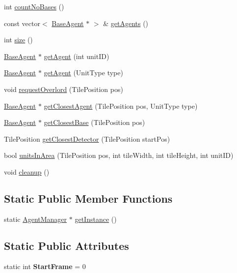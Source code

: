 \begin{DoxyCompactItemize}
\item 
int \hyperlink{class_agent_manager_a2e83c9fd3ac2e6119eded5785c8f04ce}{count\-No\-Bases} ()
\item 
const vector$<$ \hyperlink{class_base_agent}{Base\-Agent} $\ast$ $>$ \& \hyperlink{class_agent_manager_ac569494f341aa7387467de606b2f966a}{get\-Agents} ()
\item 
int \hyperlink{class_agent_manager_a8536930d26278a365165e8cdc0e12f44}{size} ()
\item 
\hyperlink{class_base_agent}{Base\-Agent} $\ast$ \hyperlink{class_agent_manager_a294399a85d15e11dfd06728f35bd6d23}{get\-Agent} (int unit\-I\-D)
\item 
\hyperlink{class_base_agent}{Base\-Agent} $\ast$ \hyperlink{class_agent_manager_aa5c4ca79ff252151f426095e914caac6}{get\-Agent} (Unit\-Type type)
\item 
void \hyperlink{class_agent_manager_a5bd9d232ef3e7d4a7d26bbade757a57d}{request\-Overlord} (Tile\-Position pos)
\item 
\hyperlink{class_base_agent}{Base\-Agent} $\ast$ \hyperlink{class_agent_manager_ac82b461b794ee807e01b26bbfa746068}{get\-Closest\-Agent} (Tile\-Position pos, Unit\-Type type)
\item 
\hyperlink{class_base_agent}{Base\-Agent} $\ast$ \hyperlink{class_agent_manager_a04a3159ec5e1b551fccb6368ab2db43d}{get\-Closest\-Base} (Tile\-Position pos)
\item 
Tile\-Position \hyperlink{class_agent_manager_a364cf19e3cd4ec5a6fa381ec77d9d451}{get\-Closest\-Detector} (Tile\-Position start\-Pos)
\item 
bool \hyperlink{class_agent_manager_aa41dbe20c6ddfba17f0422a0a879cf76}{units\-In\-Area} (Tile\-Position pos, int tile\-Width, int tile\-Height, int unit\-I\-D)
\item 
void \hyperlink{class_agent_manager_ac9cf8b4b1e2cd2aa967861ef0adbe0b6}{cleanup} ()
\end{DoxyCompactItemize}
\subsection*{Static Public Member Functions}
\begin{DoxyCompactItemize}
\item 
static \hyperlink{class_agent_manager}{Agent\-Manager} $\ast$ \hyperlink{class_agent_manager_ade8d13aa64b4343ccd15842eaf9628da}{get\-Instance} ()
\end{DoxyCompactItemize}
\subsection*{Static Public Attributes}
\begin{DoxyCompactItemize}
\item 
\hypertarget{class_agent_manager_aa80300f7d2a9a80b3fff57e1c2836c0f}{static int {\bfseries Start\-Frame} = 0}\label{class_agent_manager_aa80300f7d2a9a80b3fff57e1c2836c0f}

\end{DoxyCompactItemize}


